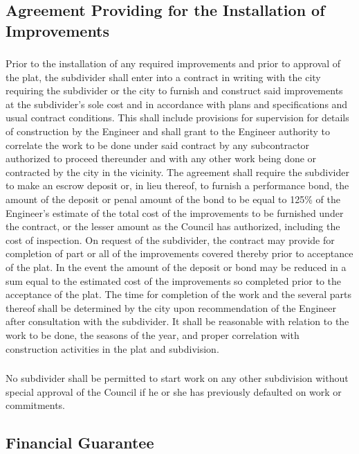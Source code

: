 \subsection{Agreement Providing for the Installation of Improvements}
\subsubsection{}
Prior to the installation of any required improvements and prior to approval of the plat, the subdivider shall enter into a contract in writing with the city requiring the subdivider or the city to furnish and construct said improvements at the subdivider’s sole cost and in accordance with plans and specifications and usual contract conditions. This shall include provisions for supervision for details of construction by the Engineer and shall grant to the Engineer authority to correlate the work to be done under said contract by any subcontractor authorized to proceed thereunder and with any other work being done or contracted by the city in the vicinity. The agreement shall require the subdivider to make an escrow deposit or, in lieu thereof, to furnish a performance bond, the amount of the deposit or penal amount of the bond to be equal to 125\% of the Engineer’s estimate of the total cost of the improvements to be furnished under the contract, or the lesser amount as the Council has authorized, including the cost of inspection. On request of the subdivider, the contract may provide for completion of part or all of the improvements covered thereby prior to acceptance of the plat. In the event the amount of the deposit or bond may be reduced in a sum equal to the estimated cost of the improvements so completed prior to the acceptance of the plat. The time for completion of the work and the several parts thereof shall be determined by the city upon recommendation of the Engineer after consultation with the subdivider. It shall be reasonable with relation to the work to be done, the seasons of the year, and proper correlation with construction activities in the plat and subdivision.
\subsubsection{}
No subdivider shall be permitted to start work on any other subdivision without special approval of the Council if he or she has previously defaulted on work or commitments.
\subsection{Financial Guarantee}
